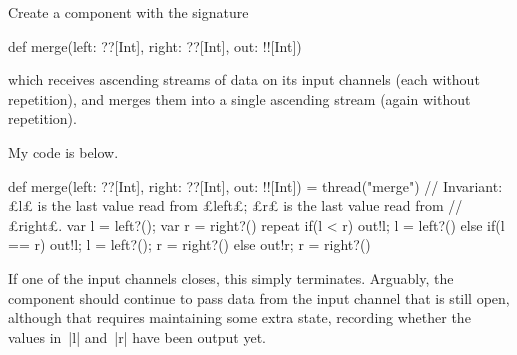 \begin{questionS}
\label{ex:merge}
Create a component with the signature
\begin{scala}
  def merge(left: ??[Int], right: ??[Int], out: !![Int])
\end{scala}
which receives ascending streams of data on its input channels (each without
repetition), and merges them into a single ascending stream (again without
repetition).
\end{questionS}


\begin{answerS}
My code is below. 
\begin{scala}
  def merge(left: ??[Int], right: ??[Int], out: !![Int]) = thread("merge"){
    // Invariant: £l£ is the last value read from £left£; £r£ is the last value read from
    // £right£.
    var l = left?(); var r = right?()
    repeat{
      if(l < r){ out!l; l = left?() }
      else if(l == r){ out!l; l = left?(); r = right?() }
      else{ out!r; r = right?() }
    }
  }
\end{scala}
If one of the input channels closes, this simply terminates.  Arguably, the
component should continue to pass data from the input channel that is still
open, although that requires maintaining some extra state, recording whether
the values in~|l| and~|r| have been output yet.  
\end{answerS}
